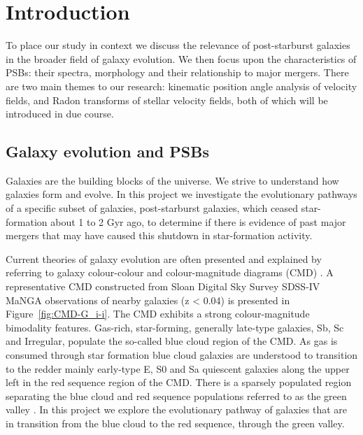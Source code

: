 \section{Introduction}
\label{sec:introduction}
To place our study in context we discuss the relevance of post-starburst galaxies in the broader field of galaxy evolution. We then focus upon the characteristics of PSBs: their spectra, morphology and their relationship to major mergers. There are two main themes to our research: kinematic position angle analysis of velocity fields, and Radon transforms of stellar velocity fields, both of which will be introduced in due course.

\subsection{Galaxy evolution and PSBs}
\label{sec:evolution}
Galaxies are the building blocks of the universe. We strive to understand how galaxies form and evolve. In this project we investigate the evolutionary pathways of a specific subset of galaxies, post-starburst galaxies, which ceased star-formation about 1 to 2 Gyr ago, to determine if there is evidence of past major mergers that may have caused this  shutdown in star-formation activity.

Current theories of galaxy evolution are often presented and explained  by referring to galaxy colour-colour and colour-magnitude diagrams (CMD) \citep[see e.g.][]{2001AJ....122.1861S, 2003ApJ...585L...5H, 2003ApJS..149..289B,baldry2004quantifying,2006MNRAS.373..469B}. A representative CMD constructed from Sloan Digital Sky Survey SDSS-IV MaNGA observations of nearby galaxies (z < 0.04) is presented in  Figure~\ref{fig:CMD-G_i-i}. The CMD exhibits a strong colour-magnitude bimodality features.  Gas-rich, star-forming, generally late-type galaxies, Sb, Sc and Irregular, populate the so-called blue cloud region of the CMD. As gas is consumed through star formation blue cloud galaxies are understood to transition to the redder mainly early-type E, S0 and Sa quiescent galaxies along the upper left in the red sequence region of the CMD. There is a sparsely populated region separating the blue cloud and red sequence populations referred to as the green valley \citep{2004ApJ...608..752B}. In this project we explore the evolutionary pathway of galaxies that are in transition from the blue cloud to the red sequence, through the green valley.

